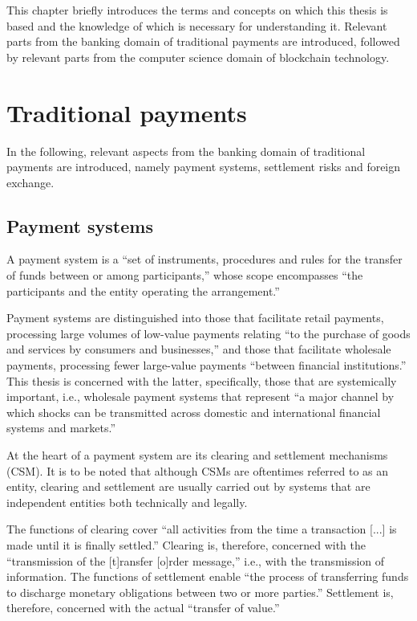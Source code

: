 This chapter briefly introduces the terms and concepts on which this thesis is based and the knowledge of which is necessary for understanding it.
Relevant parts from the banking domain of traditional payments are introduced, followed by relevant parts from the computer science domain of blockchain technology.

\section{Traditional payments}

In the following, relevant aspects from the banking domain of traditional payments are introduced, namely payment systems, settlement risks and foreign exchange.

\subsection{Payment systems}

A payment system is a ``set of instruments, procedures and rules for the transfer of funds between or among participants,'' whose scope encompasses ``the participants and the entity operating the arrangement.'' \autocite[13]{bis2016cpmiglossary}

Payment systems are distinguished into those that facilitate retail payments, processing large volumes of low-value payments relating ``to the purchase of goods and services by consumers and businesses,'' and those that facilitate wholesale payments, processing fewer large-value payments ``between financial institutions.'' \autocite[22]{bech2020}
This thesis is concerned with the latter, specifically, those that are systemically important, i.e., wholesale payment systems that represent ``a major channel by which shocks can be transmitted across domestic and international financial systems and markets.'' \autocite[1]{cpmi2001}

At the heart of a payment system are its clearing and settlement mechanisms (CSM).
It is to be noted that although CSMs are oftentimes referred to as an entity, clearing and settlement are usually carried out by systems that are independent entities both technically and legally.

The functions of clearing cover ``all activities from the time a transaction [...] is made until it is finally settled.'' \autocite[6]{loeber2006}
Clearing is, therefore, concerned with the ``transmission of the [t]ransfer [o]rder message,'' \autocite[21]{vereecken2003} i.e., with the transmission of information.
The functions of settlement enable ``the process of transferring funds to discharge monetary obligations between two or more parties.'' \autocite[23]{bech2020}
Settlement is, therefore, concerned with the actual ``transfer of value.'' \autocite[21]{vereecken2003}

